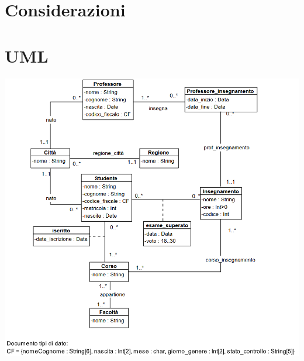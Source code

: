\documentclass[12pt, letterpaper]{article}
\begin{document}
\section{Considerazioni}
\newpage
\section{UML}
\includegraphics[width=\textwidth]{images/UML.png}
\end{document}
